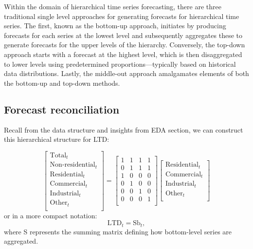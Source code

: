 \documentclass[11pt,a4paper,]{article}
\begin{document}
Within the domain of hierarchical time series forecasting, there are three traditional single level approaches for generating forecasts for hierarchical time series. The first, known as the bottom-up approach, initiates by producing forecasts for each series at the lowest level and subsequently aggregates these to generate forecasts for the upper levels of the hierarchy. Conversely, the top-down approach starts with a forecast at the highest level, which is then disaggregated to lower levels using predetermined proportions---typically based on historical data distributions. Lastly, the middle-out approach amalgamates elements of both the bottom-up and top-down methods.

\subsection{Forecast reconciliation}\label{forecast-reconciliation}

Recall from the data structure and insights from EDA section, we can construct this hierarchical structure for LTD:

\[
\begin{bmatrix}
  \text{Total}_{t} \\
  \text{Non-residential}_{t} \\
  \text{Residential}_{t} \\
  \text{Commercial}_{t} \\
  \text{Industrial}_{t} \\
  \text{Other}_{t} \\
  \end{bmatrix}
=
\begin{bmatrix}
  1 & 1 & 1 & 1 \\
  0 & 1 & 1 & 1 \\
  1 & 0 & 0 & 0 \\
  0 & 1 & 0 & 0 \\
  0 & 0 & 1 & 0 \\
  0 & 0 & 0 & 1 \\
\end{bmatrix}
\begin{bmatrix}
  \text{Residential}_{t} \\
  \text{Commercial}_{t} \\
  \text{Industrial}_{t} \\
  \text{Other}_{t} \\
\end{bmatrix}
\]
or in a more compact notation:
\[
\text{LTD}_{t} = \text{S}\text{b}_{t},
\]
where S represents the summing matrix defining how bottom-level series are aggregated.
\end{document}
